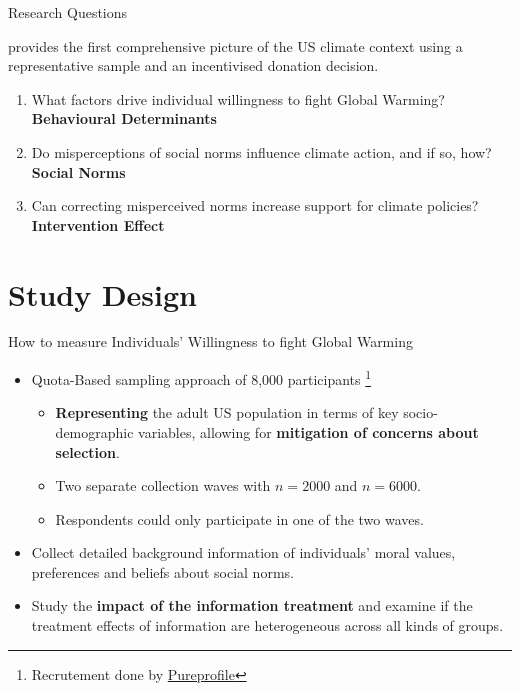 \documentclass{beamer}
\begin{document}
\begin{frame}{Research Questions}

    \textcite{andre2024} provides the first comprehensive picture of the US climate context using a representative sample and an incentivised donation decision.
    
    \medskip
    
    \begin{enumerate}
    \setlength{\itemsep}{8pt}
        \item What factors drive individual willingness to fight Global Warming? \textbf{Behavioural Determinants}
        \item Do misperceptions of social norms influence climate action, and if so, how? \textbf{Social Norms}
        \item Can correcting misperceived norms increase support for climate policies? \textbf{Intervention Effect}
    \end{enumerate}

\end{frame}

\section{Study Design}

\begin{frame}{How to measure Individuals' Willingness to fight Global Warming}
    \begin{itemize}
    \setlength{\itemsep}{8pt}
        \item Quota-Based sampling approach of 8,000 participants \footnote{Recrutement done by \href{https://business.pureprofile.com/who-we-are/}{Pureprofile}}
        
        \begin{itemize}
            \item \textbf{Representing} the adult US population in terms of key socio-demographic variables, allowing for \textbf{mitigation of concerns about selection}.
            \item Two separate collection waves with $n=2000$ and $n=6000$.
            \item Respondents could only participate in one of the two waves.
        \end{itemize}

        \item Collect detailed background information of individuals' moral values, preferences and beliefs about social norms.
        \item Study the \textbf{impact of the information treatment} and examine if the treatment effects of information are heterogeneous across all kinds of groups.
        
    \end{itemize}
    
\end{frame}
\end{document}
